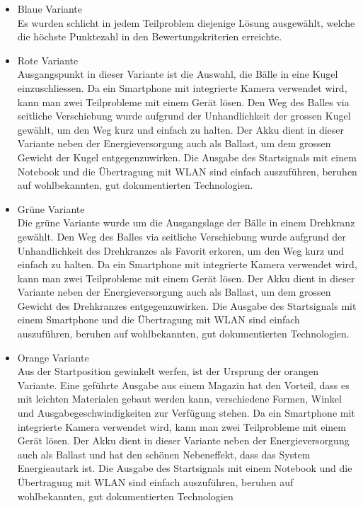 \begin{itemize}
	\item Blaue Variante\\
	Es wurden schlicht in jedem Teilproblem diejenige Lösung ausgewählt, welche die höchste Punktezahl in den Bewertungskriterien erreichte.
	
	\item Rote Variante\\
	Ausgangspunkt in dieser Variante ist die Auswahl, die Bälle in eine Kugel einzuschliessen. Da ein Smartphone mit integrierte Kamera verwendet wird, kann man zwei Teilprobleme mit einem Gerät lösen. Den Weg des Balles via seitliche Verschiebung wurde aufgrund der Unhandlichkeit der grossen Kugel gewählt, um den Weg kurz und einfach zu halten. Der Akku dient in dieser Variante neben der Energieversorgung auch als Ballast, um dem grossen Gewicht der Kugel entgegenzuwirken. Die Ausgabe des Startsignals mit einem Notebook und die Übertragung mit WLAN sind einfach auszuführen, beruhen auf wohlbekannten, gut dokumentierten Technologien.
	
	\item Grüne Variante\\
	Die grüne Variante wurde um die Ausgangslage der Bälle in einem Drehkranz gewählt. Den Weg des Balles via seitliche Verschiebung wurde aufgrund der Unhandlichkeit des Drehkranzes als Favorit erkoren, um den Weg kurz und einfach zu halten. Da ein Smartphone mit integrierte Kamera verwendet wird, kann man zwei Teilprobleme mit einem Gerät lösen. Der Akku dient in dieser Variante neben der Energieversorgung auch als Ballast, um dem grossen Gewicht des Drehkranzes entgegenzuwirken. Die Ausgabe des Startsignals mit einem Smartphone und die Übertragung mit WLAN sind einfach auszuführen, beruhen auf wohlbekannten, gut dokumentierten Technologien.
	
	\item Orange Variante\\
	Aus der Startposition gewinkelt werfen, ist der Ursprung der orangen Variante. Eine geführte Ausgabe aus einem Magazin hat den Vorteil, dass es mit leichten Materialen gebaut werden kann, verschiedene Formen, Winkel und Ausgabegeschwindigkeiten zur Verfügung stehen. Da ein Smartphone mit integrierte Kamera verwendet wird, kann man zwei Teilprobleme mit einem Gerät lösen. Der Akku dient in dieser Variante neben der Energieversorgung auch als Ballast und hat den schönen Nebeneffekt, dass das System Energieautark ist. Die Ausgabe des Startsignals mit einem Notebook und die Übertragung mit WLAN sind einfach auszuführen, beruhen auf wohlbekannten, gut dokumentierten Technologien
\end{itemize}